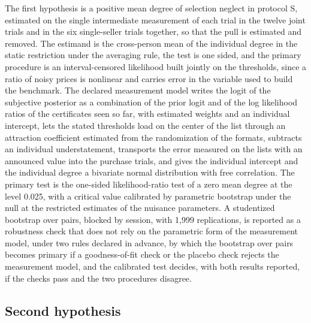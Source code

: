 \documentclass[11pt,a4paper]{article}
\begin{document}
The first hypothesis is a positive mean degree of selection neglect in protocol S, estimated on the single intermediate measurement of each trial in the twelve joint trials and in the six single-seller trials together, so that the pull is estimated and removed. The estimand is the cross-person mean of the individual degree in the static restriction under the averaging rule, the test is one sided, and the primary procedure is an interval-censored likelihood built jointly on the thresholds, since a ratio of noisy prices is nonlinear and carries error in the variable used to build the benchmark. The declared measurement model writes the logit of the subjective posterior as a combination of the prior logit and of the log likelihood ratios of the certificates seen so far, with estimated weights and an individual intercept, lets the stated thresholds load on the center of the list through an attraction coefficient estimated from the randomization of the formats, subtracts an individual understatement, transports the error measured on the lists with an announced value into the purchase trials, and gives the individual intercept and the individual degree a bivariate normal distribution with free correlation. The primary test is the one-sided likelihood-ratio test of a zero mean degree at the level 0.025, with a critical value calibrated by parametric bootstrap under the null at the restricted estimates of the nuisance parameters. A studentized bootstrap over pairs, blocked by session, with 1,999 replications, is reported as a robustness check that does not rely on the parametric form of the measurement model, under two rules declared in advance, by which the bootstrap over pairs becomes primary if a goodness-of-fit check or the placebo check rejects the measurement model, and the calibrated test decides, with both results reported, if the checks pass and the two procedures disagree.

\subsection{Second hypothesis}
\end{document}
